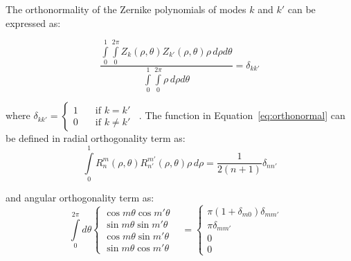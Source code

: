 \begin{appendices}
The orthonormality of the Zernike polynomials of modes $k$ and $k'$ can be expressed as:

\begin{equation} \label{eq:orthonormal} 
\frac{\int\limits_{0}^{1}\int\limits_{0}^{2\pi} Z_{k}(\rho,\theta)Z_{k'}(\rho,\theta) \rho\, d\rho d\theta}{\int\limits_{0}^{1}\int\limits_{0}^{2\pi} \rho\, d\rho d\theta }
=\delta_{kk'}
\end{equation} 

\noindent where %
$\delta_{kk'} =
  \begin{cases}
    1       & \quad \text{if } k=k' \\
    0  & \quad \text{if } k\neq k'   %
  \end{cases}
$ \,. The function in Equation~\ref{eq:orthonormal} can be defined in radial orthogonality term as:
\begin{equation} \label{eq:ortho_radial} 
 \int\limits_{0}^{1} R_{n}^{m}(\rho,\theta)R_{n'}^{m'}(\rho,\theta) \rho\, d\rho = \frac{1}{2(n + 1) } \delta_{nn'}
\end{equation}

\noindent and angular orthogonality term as:
\begin{equation} 
{
\int\limits_{0}^{2\pi}  d\theta %
\begin{cases}
     \cos m\theta \cos m'\theta & \\  %
      \sin m\theta \sin m'\theta & \\
     \cos m\theta \sin m'\theta & \\    %
      \sin m\theta \cos m'\theta & 
  \end{cases} 
  = 
  \begin{cases}
   \pi(1 + \delta_{m0})\delta_{mm'} & \\
	\pi\delta_{mm'}  & \\
	 0 & \\
	 0 &
  \end{cases}
}\label{eq:ortho_angular} 
\end{equation}





\end{appendices}

